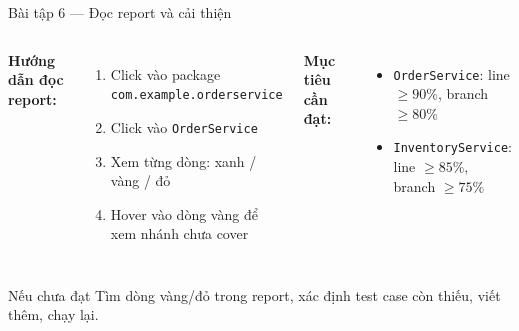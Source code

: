 \documentclass[aspectratio=169,10pt]{beamer}
\begin{document}
\begin{frame}{Bài tập 6 --- Đọc report và cải thiện}
  \begin{columns}
    \textbf{Hướng dẫn đọc report:}
    \begin{enumerate}
      \item Click vào package \texttt{com.example.orderservice}
      \item Click vào \texttt{OrderService}
      \item Xem từng dòng: xanh / vàng / đỏ
      \item Hover vào dòng vàng để xem nhánh chưa cover
    \end{enumerate}

    \textbf{Mục tiêu cần đạt:}
    \begin{itemize}
      \item \texttt{OrderService}: line $\geq 90\%$, branch $\geq 80\%$
      \item \texttt{InventoryService}: line $\geq 85\%$, branch $\geq 75\%$
    \end{itemize}
  \end{columns}

  \vspace{0.4em}
  \begin{alertblock}{Nếu chưa đạt}
    Tìm dòng vàng/đỏ trong report, xác định test case còn thiếu,
    viết thêm, chạy lại.
  \end{alertblock}
\end{frame}
\end{document}

